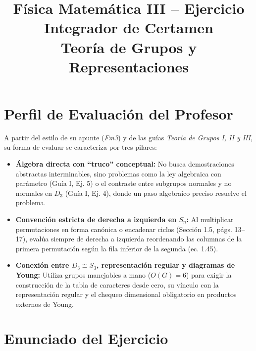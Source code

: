 \documentclass[11pt, a4paper]{article}
\title{\textbf{Física Matemática III -- Ejercicio Integrador de Certamen}\\ \large Teoría de Grupos y Representaciones}
\author{}
\date{}
\begin{document}
\maketitle

\section*{Perfil de Evaluación del Profesor}
A partir del estilo de su apunte (\textit{Fm3}) y de las guías \textit{Teoría de Grupos I, II y III}, su forma de evaluar se caracteriza por tres pilares:
\begin{itemize}
    \item \textbf{Álgebra directa con ``truco'' conceptual:} No busca demostraciones abstractas interminables, sino problemas como la ley algebraica con parámetro (Guía I, Ej. 5) o el contraste entre subgrupos normales y no normales en $D_3$ (Guía I, Ej. 4), donde un paso algebraico preciso resuelve el problema.
    \item \textbf{Convención estricta de derecha a izquierda en $S_n$:} Al multiplicar permutaciones en forma canónica o encadenar ciclos (Sección 1.5, págs. 13--17), evalúa siempre de derecha a izquierda reordenando las columnas de la primera permutación según la fila inferior de la segunda (ec. 1.45).
    \item \textbf{Conexión entre $D_3 \cong S_3$, representación regular y diagramas de Young:} Utiliza grupos manejables a mano ($O(G) = 6$) para exigir la construcción de la tabla de caracteres desde cero, su vínculo con la representación regular y el chequeo dimensional obligatorio en productos externos de Young.
\end{itemize}

\hrulefill

\section*{Enunciado del Ejercicio}
\end{document}

